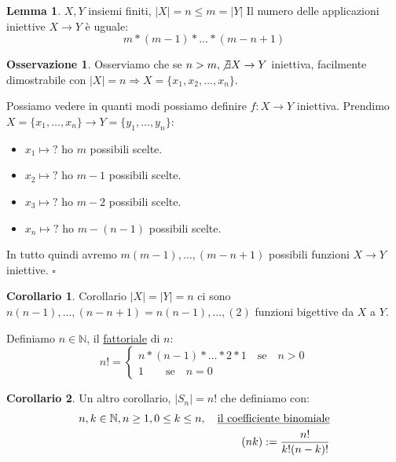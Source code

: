 \documentclass{article}
\theoremstyle{definition}
\newtheorem{oss}{Osservazione}[section]
\newtheorem{lemma}{Lemma}[section]
\newtheorem{corollario}{Corollario}[section]
\begin{document}
\begin{tcolorbox}
        
\begin{lemma}
$X,Y$ insiemi finiti, $|X| = n \le m = |Y|$ Il numero delle applicazioni iniettive $X \to Y$ è uguale:
\begin{equation*}
        m * (m-1)*\ldots*(m-n+1)
\end{equation*}
\end{lemma}
\end{tcolorbox}

\begin{tcolorbox}
\begin{oss}
Osserviamo che se $n > m, \not \exists X \to Y$ iniettiva, facilmente dimostrabile con $|X| = n \Rightarrow X = \{x_1,x_2,\ldots,x_n\}$. \par
Possiamo vedere in quanti modi possiamo definire $f:X \to Y$ iniettiva. 
Prendimo $X = \{x_1,\ldots,x_n\} \to Y = \{y_1,\ldots,y_n\}$:
\begin{itemize}
        \item $x_1 \mapsto \mbox{?}$ ho $m$ possibili scelte.
        \item $x_2 \mapsto \mbox{?}$ ho $m-1$ possibili scelte.
        \item $x_3 \mapsto \mbox{?}$ ho $m-2$ possibili scelte.
        \item $x_n \mapsto \mbox{?}$ ho $m-(n-1)$ possibili scelte.
\end{itemize}
In tutto quindi avremo $m(m-1),\ldots,(m-n+1)$ possibili funzioni $X \to Y$ iniettive. $\square$ \par
\end{oss}
\end{tcolorbox}

\begin{tcolorbox}
\begin{corollario}
Corollario $|X| = |Y| = n$ ci sono $n(n-1),\ldots,(n-n+1) = n(n-1),\ldots,(2)$ funzioni bigettive da $X$ a $Y$. \par
Definiamo $n \in \mathbb{N}$, il \underline{fattoriale} di $n$:
\[ n! = 
\begin{cases}
        n * (n-1) * \ldots * 2 * 1 \quad \mbox{se} \quad n>0\\
        1 \quad \quad \mbox{se} \quad n = 0
\end{cases}
\]
\end{corollario}
\end{tcolorbox}

\begin{tcolorbox}
\begin{corollario}
Un altro corollario, $|S_n| = n$! che definiamo con:
        \begin{align*}
                n,k \in \mathbb{N}, n \ge 1, 0 \le k \le n, \quad \mbox{\underline{il coefficiente binomiale}} \\
                (n k) := \frac{n!}{k!(n-k)!}
        \end{align*}
\end{corollario}
\end{tcolorbox}
\end{document}
